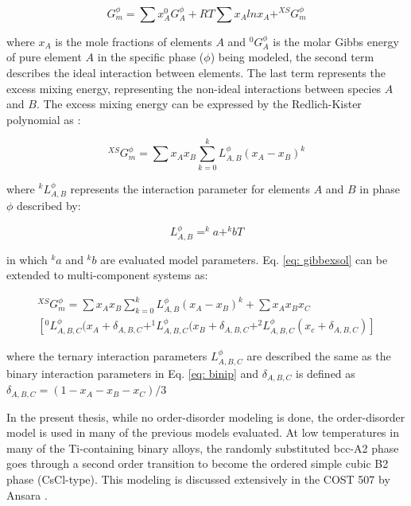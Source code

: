 \begin{equation}
\label{eq: gibbssolution}
G_m^{\phi} = \sum x_{A} ^{0}G_{A}^{\phi} + R T \sum x_{A} ln x_{A} + ^{XS}G_{m}^{\phi}
\end{equation}

\noindent where $x_{A}$ is the mole fractions of elements $A$ and $^{0}G_{A}^{\phi}$ is the molar Gibbs energy of pure element $A$ in the specific phase ($\phi$) being modeled, the second term describes the ideal interaction between elements. The last term represents the excess mixing energy, representing the non-ideal interactions between species $A$ and $B$. The excess mixing energy can be expressed by the Redlich-Kister polynomial as \cite{Redlich1948b}: 

\begin{equation}
\label{eq: gibbexsol}
^{XS}G_m^{\phi} = \sum x_{A} x_{B} \sum_{k=0} ^{k}L_{A,B}^{\phi} (x_{A} - x_{B})^k
\end{equation}

\noindent where $^kL_{A,B}^{\phi}$ represents the interaction parameter for elements $A$ and $B$ in phase $\phi$ described by:

\begin{equation}
\label{eq: binip}
L_{A,B}^{\phi} = ^{k}a + ^{k}bT
\end{equation}

\noindent in which $^{k}a$ and $^{k}b$ are evaluated model parameters. Eq. \ref{eq: gibbexsol} can be extended to multi-component systems as:

\begin{multline}
\label{eq: gibbexsolmulti}
^{XS}G_m^{\phi} = \sum x_{A} x_{B} \sum_{k=0} ^{k}L_{A,B}^{\phi} (x_{A} - x_{B})^k + \sum x_{A} x_{B} x_{C} \\ \left[ ^{0}L_{A, B, C}^{\phi} (x_{A} + \delta_{A, B, C} + ^{1}L_{A, B, C}^{\phi} (x_{B} + \delta_{A, B, C} + ^{2}L_{A, B, C}^{\phi} (x_{c} + \delta_{A, B, C} ) \right]
\end{multline}

\noindent where the ternary interaction parameters $L_{A, B, C}^{\phi}$ are described the same as the binary interaction parameters in Eq. \ref{eq: binip} and $\delta_{A, B, C}$ is defined as $\delta_{A, B, C} = ( 1 - x_{A} - x_{B} - x_{C})/3$

In the present thesis, while no order-disorder modeling is done, the order-disorder model is used in many of the previous models evaluated. At low temperatures in many of the Ti-containing binary alloys, the randomly substituted bcc-A2 phase goes through a second order transition to become the ordered simple cubic B2 phase (CsCl-type). This modeling is discussed extensively in the COST 507 by Ansara \cite{Ansara1998}. 


